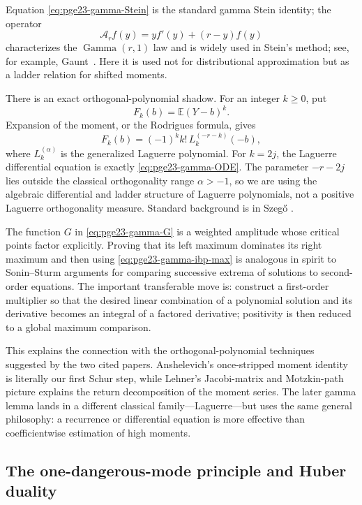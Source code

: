 \documentclass[11pt]{article}
\numberwithin{equation}{section}
\newcommand{\E}{\mathbb E}
\newcommand{\GammaLaw}{\operatorname{Gamma}}
\begin{document}
Equation \eqref{eq:pge23-gamma-Stein} is the standard gamma Stein identity; the operator
\[
  \mathcal A_rf(y)=yf'(y)+(r-y)f(y)
\]
characterizes the $\GammaLaw(r,1)$ law and is widely used in Stein's method; see, for example, Gaunt~\cite{Gaunt2016}.
Here it is used not for distributional approximation but as a ladder relation for shifted moments.

There is an exact orthogonal-polynomial shadow.
For an integer $k\ge0$, put
\[
  F_k(b)=\E(Y-b)^k.
\]
Expansion of the moment, or the Rodrigues formula, gives
\begin{equation}\label{eq:Laguerre-identity}
  F_k(b)=(-1)^k k!\,L_k^{(-r-k)}(-b),
\end{equation}
where $L_k^{(\alpha)}$ is the generalized Laguerre polynomial.
For $k=2j$, the Laguerre differential equation is exactly \eqref{eq:pge23-gamma-ODE}.
The parameter $-r-2j$ lies outside the classical orthogonality range $\alpha>-1$, so we are using the algebraic differential and ladder structure of Laguerre polynomials, not a positive Laguerre orthogonality measure.
Standard background is in Szeg\H{o} \cite{Szego1975}.

The function $G$ in \eqref{eq:pge23-gamma-G} is a weighted amplitude whose critical points factor explicitly.
Proving that its left maximum dominates its right maximum and then using \eqref{eq:pge23-gamma-ibp-max} is analogous in spirit to Sonin--Sturm arguments for comparing successive extrema of solutions to second-order equations.
The important transferable move is: construct a first-order multiplier so that the desired linear combination of a polynomial solution and its derivative becomes an integral of a factored derivative; positivity is then reduced to a global maximum comparison.

This explains the connection with the orthogonal-polynomial techniques suggested by the two cited papers.
Anshelevich's once-stripped moment identity is literally our first Schur step, while Lehner's Jacobi-matrix and Motzkin-path picture explains the return decomposition of the moment series.
The later gamma lemma lands in a different classical family---Laguerre---but uses the same general philosophy: a recurrence or differential equation is more effective than coefficientwise estimation of high moments.

\subsection{The one-dangerous-mode principle and Huber duality}
\end{document}
